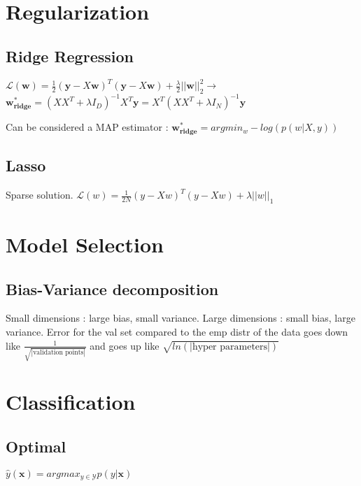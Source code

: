 \section{Regularization}
\subsection{Ridge Regression}
$\mathcal{L}(\mathbf{w}) = \frac{1}{2} (\mathbf{y} - X\mathbf{w})^T(\mathbf{y} - X\mathbf{w}) + \frac{\lambda}{2} ||\mathbf{w}||^2_2 \rightarrow$
$\mathbf{w^*_{ridge}} = (XX^T + \lambda I_D)^{-1}X^T\mathbf{y} = X^T(XX^T + \lambda I_N)^{-1}\mathbf{y}$

Can be considered a MAP estimator : $\mathbf{w^*_{ridge}} = arg min_w - log(p(w|X,y))$

\subsection{Lasso}
Sparse solution.
$\mathcal{L}(w) = \frac{1}{2N} (y - Xw)^T(y - Xw) + \lambda ||w||_1 $

\section{Model Selection}
\subsection{Bias-Variance decomposition}
Small dimensions : large bias, small variance.
Large dimensions : small bias, large variance.
Error for the val set compared to the emp distr of the data goes down like $\frac{1}{\sqrt{|\text{validation points}|}}$ and goes up like $\sqrt{ln(|\text{hyper parameters}|)}$


\section{Classification}
\subsection{Optimal}
$\hat{y}(\mathbf{x}) = argmax_{y\in \mathcal{Y}} p(y|\mathbf{x})$

